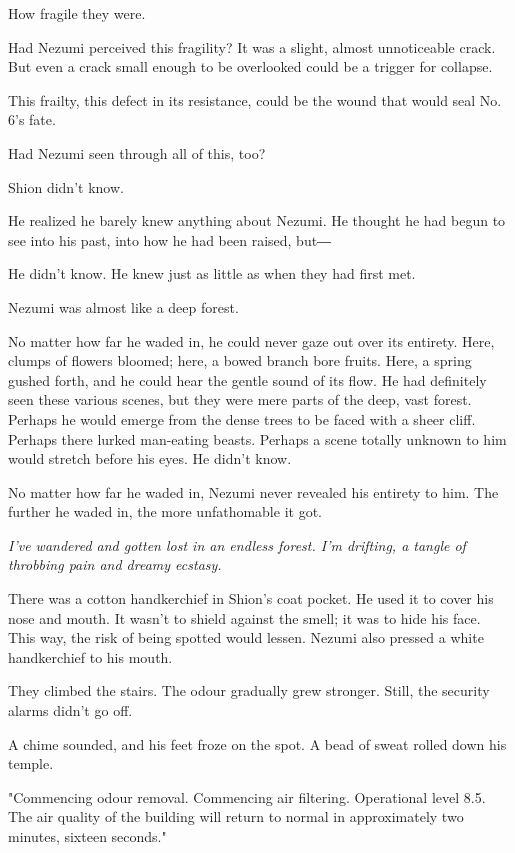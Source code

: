 How fragile they were.

Had Nezumi perceived this fragility? It was a slight, almost
unnoticeable crack. But even a crack small enough to be overlooked could
be a trigger for collapse.

This frailty, this defect in its resistance, could be the wound that
would seal No. 6's fate.

Had Nezumi seen through all of this, too?

Shion didn't know.

He realized he barely knew anything about Nezumi. He thought he had
begun to see into his past, into how he had been raised, but―

He didn't know. He knew just as little as when they had first met.

Nezumi was almost like a deep forest.

No matter how far he waded in, he could never gaze out over its
entirety. Here, clumps of flowers bloomed; here, a bowed branch bore
fruits. Here, a spring gushed forth, and he could hear the gentle sound
of its flow. He had definitely seen these various scenes, but they were
mere parts of the deep, vast forest. Perhaps he would emerge from the
dense trees to be faced with a sheer cliff. Perhaps there lurked
man-eating beasts. Perhaps a scene totally unknown to him would stretch
before his eyes. He didn't know.

No matter how far he waded in, Nezumi never revealed his entirety to
him. The further he waded in, the more unfathomable it got.

\emph{I've wandered and gotten lost in an endless forest. I'm drifting, a
	tangle of throbbing pain and dreamy ecstasy.}

\mybreak

There was a cotton handkerchief in Shion's coat pocket. He used it to
cover his nose and mouth. It wasn't to shield against the smell; it was
to hide his face. This way, the risk of being spotted would lessen.
Nezumi also pressed a white handkerchief to his mouth.

They climbed the stairs. The odour gradually grew stronger. Still, the
security alarms didn't go off.

A chime sounded, and his feet froze on the spot. A bead of sweat rolled
down his temple.

"Commencing odour removal. Commencing air filtering. Operational level
8.5. The air quality of the building will return to normal in
approximately two minutes, sixteen seconds."~

